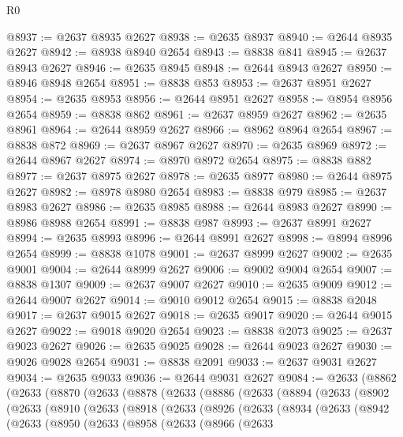 \begin{lexlean}{R0}
\begin{coremodule}
@8937 := @2637 @8935 @2627
@8938 := @2635 @8937
@8940 := @2644 @8935 @2627
@8942 := @8938 @8940 @2654
@8943 := @8838 @841
@8945 := @2637 @8943 @2627
@8946 := @2635 @8945
@8948 := @2644 @8943 @2627
@8950 := @8946 @8948 @2654
@8951 := @8838 @853
@8953 := @2637 @8951 @2627
@8954 := @2635 @8953
@8956 := @2644 @8951 @2627
@8958 := @8954 @8956 @2654
@8959 := @8838 @862
@8961 := @2637 @8959 @2627
@8962 := @2635 @8961
@8964 := @2644 @8959 @2627
@8966 := @8962 @8964 @2654
@8967 := @8838 @872
@8969 := @2637 @8967 @2627
@8970 := @2635 @8969
@8972 := @2644 @8967 @2627
@8974 := @8970 @8972 @2654
@8975 := @8838 @882
@8977 := @2637 @8975 @2627
@8978 := @2635 @8977
@8980 := @2644 @8975 @2627
@8982 := @8978 @8980 @2654
@8983 := @8838 @979
@8985 := @2637 @8983 @2627
@8986 := @2635 @8985
@8988 := @2644 @8983 @2627
@8990 := @8986 @8988 @2654
@8991 := @8838 @987
@8993 := @2637 @8991 @2627
@8994 := @2635 @8993
@8996 := @2644 @8991 @2627
@8998 := @8994 @8996 @2654
@8999 := @8838 @1078
@9001 := @2637 @8999 @2627
@9002 := @2635 @9001
@9004 := @2644 @8999 @2627
@9006 := @9002 @9004 @2654
@9007 := @8838 @1307
@9009 := @2637 @9007 @2627
@9010 := @2635 @9009
@9012 := @2644 @9007 @2627
@9014 := @9010 @9012 @2654
@9015 := @8838 @2048
@9017 := @2637 @9015 @2627
@9018 := @2635 @9017
@9020 := @2644 @9015 @2627
@9022 := @9018 @9020 @2654
@9023 := @8838 @2073
@9025 := @2637 @9023 @2627
@9026 := @2635 @9025
@9028 := @2644 @9023 @2627
@9030 := @9026 @9028 @2654
@9031 := @8838 @2091
@9033 := @2637 @9031 @2627
@9034 := @2635 @9033
@9036 := @2644 @9031 @2627
@9084 := @2633
    (@8862
      (@2633
        (@8870
          (@2633
            (@8878
              (@2633
                (@8886
                  (@2633
                    (@8894
                      (@2633
                        (@8902
                          (@2633
                            (@8910
                              (@2633
                                (@8918
                                  (@2633
                                    (@8926
                                      (@2633
                                        (@8934
                                          (@2633
                                            (@8942
                                              (@2633
                                                (@8950
                                                  (@2633
                                                    (@8958
                                                      (@2633
                                                        (@8966
                                                          (@2633

\end{coremodule}
\end{lexlean}
